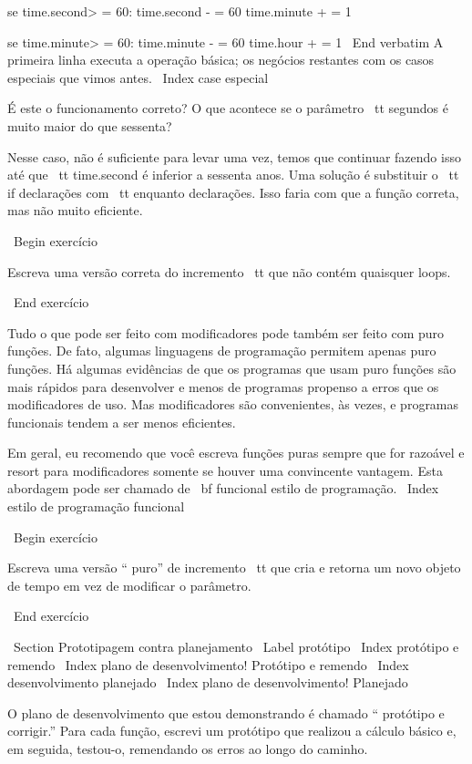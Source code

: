 \documentclass[10pt]{book}
\begin{document}
\begin {itemize}
{{{{{{{{{{{{{{    se time.second> = 60:
        time.second - = 60
        time.minute + = 1

    se time.minute> = 60:
        time.minute - = 60
        time.hour + = 1
\ End {verbatim}
%
A primeira linha executa a operação básica; os negócios restantes
com os casos especiais que vimos antes.
\ Index {case especial}

É este o funcionamento correto? O que acontece se o parâmetro {\ tt segundos}
é muito maior do que sessenta?  

Nesse caso, não é suficiente para levar
uma vez, temos que continuar fazendo isso até que {\ tt time.second} é inferior a sessenta anos.
Uma solução é substituir o {\ tt if} declarações com {\ tt enquanto}
declarações. Isso faria com que a função correta, mas não
muito eficiente.

\ Begin {} exercício

Escreva uma versão correta do incremento {\ tt} que
não contém quaisquer loops.

\ End {} exercício

Tudo o que pode ser feito com modificadores pode também ser feito com puro
funções. De fato, algumas linguagens de programação permitem apenas puro
funções. Há algumas evidências de que os programas que usam puro
funções são mais rápidos para desenvolver e menos de programas propenso a erros
que os modificadores de uso. Mas modificadores são convenientes, às vezes,
e programas funcionais tendem a ser menos eficientes.

Em geral, eu recomendo que você escreva funções puras sempre que for
razoável e resort para modificadores somente se houver uma convincente
vantagem. Esta abordagem pode ser chamado de {\ bf funcional
estilo de programação}.
\ Index {estilo de programação funcional}


\ Begin {} exercício

Escreva uma versão `` puro'' de {incremento \ tt} que cria e retorna
um novo objeto de tempo em vez de modificar o parâmetro.

\ End {} exercício


\ Section {Prototipagem contra planejamento}
\ Label {protótipo}
\ Index {protótipo e remendo}
\ Index {plano de desenvolvimento! Protótipo e remendo}
\ Index {desenvolvimento planejado}
\ Index {plano de desenvolvimento! Planejado}

O plano de desenvolvimento que estou demonstrando é chamado `` protótipo e
corrigir.'' Para cada função, escrevi um protótipo que realizou a
cálculo básico e, em seguida, testou-o, remendando os erros ao longo do
caminho.

}}}}}}}}}}}}}}
\end{itemize}
\end{document}
